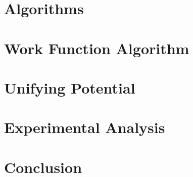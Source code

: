 \documentclass[11pt]{article}
\theoremstyle{definition}
\begin{document}
\section{Algorithms}
\label{sec:algos}


\section{Work Function Algorithm}
\label{sec:wfa}


\section{Unifying Potential}
\label{sec:uniPot}


\section{Experimental Analysis}
\label{sec:bijAna}


\section{Conclusion}
\label{sec:con}





\end{document}

